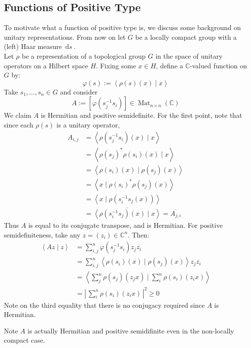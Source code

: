 \documentclass[11pt, x11names]{book}
\newcommand{\cc}{\mathbb{C}}
\renewcommand{\bar}[1]{\overline{#1}}
\newcommand{\brangle}[1]{\left\langle #1 \right\rangle}
\newcommand{\abs}[1]{\left| \, #1  \,\right|}
\newcommand{\sqbrack}[1]{\left[ #1 \right]}
\newcommand{\inv}[1]{#1^{-1}}
\DeclareMathOperator{\mat}{Mat}
\newcommand{\ds}{\, \mathrm{d}s \ }
\begin{document}
\subsection{Functions of Positive Type}
\label{subsection: Positive Type Funcs}
To motivate what a function of positive type is, we discuss some background on unitary representations. From now on let $G$ be a locally compact group with a (left) Haar measure $\ds$.\\

Let $\rho$ be a representation of a topological group $G$ in the space of unitary operators on a Hilbert space $H$. Fixing some $x \in H$, define a $\cc$-valued function on $G$ by:
\begin{equation*}
    \varphi(s) := \brangle{\rho(s)(x) \mid x}
\end{equation*}
Take $s_1, \ldots, s_n \in G$ and consider
\begin{equation*}
    A := \sqbrack{\varphi(\inv{s_j}s_i)} \in \mat_{n \times n}(\cc)
\end{equation*}
We claim $A$ is Hermitian and positive semidefinite. For the first point, note that since each $\rho(s)$ is a unitary operator,
\begin{equation*}
\begin{split}
    A_{i, j} &= \brangle{\rho(\inv{s_j}s_i)(x) \mid x}\\ 
    &= \brangle{\rho(s_j)^* \rho(s_i)(x) \mid x}\\
    &= \brangle{\rho(s_i)(x) \mid \rho(s_j)(x)}\\
    &= \brangle{x \mid \rho(s_i)^* \rho(s_j)(x)}\\
    &= \brangle{x \mid \rho(\inv{s_i}s_j(x))}\\
    &= \bar{\brangle{\rho(\inv{s_i}s_j)(x) \mid x}} = \bar{A_{j, i}}
\end{split}
\end{equation*}
Thus $A$ is equal to its conjugate transpose, and is Hermitian. For positive semidefiniteness, take any $z = (z_i) \in \cc^n$. Then:
\begin{equation*}
    \begin{split}
        \brangle{Az \mid z} &= \sum^n_{i, j} \varphi(\inv{s_j}s_i)z_j \bar{z_i}\\
        &= \sum^n_{i, j} \brangle{\rho(s_i)(x) \mid \rho(s_j)(x)}z_j \bar{z_i}\\
        &= \brangle{\sum^n_{j} \rho(s_j)(z_j x) \mid \sum^n_{i} \rho(s_i)(z_ix)}\\
        &= \abs{\sum^n_i \rho(s_i)(z_i x)}^2 \geq 0
    \end{split}
\end{equation*}
Note on the third equality that there is no conjugacy required since $A$ is Hermitian.
\begin{remark}
    Note $A$ is actually Hermitian and positive semidifinite even in the non-locally compact case.
\end{remark}
\end{document}
